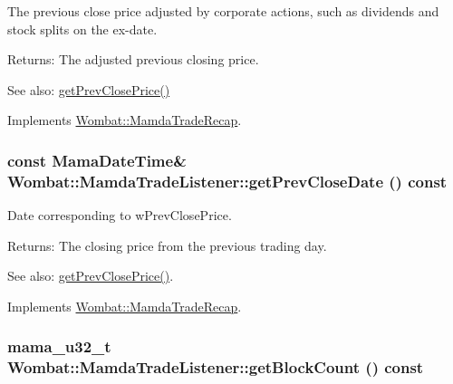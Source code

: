 The previous close price adjusted by corporate actions, such as dividends and stock splits on the ex-date. 

\begin{Desc}
\item[Returns:]The adjusted previous closing price. \end{Desc}
\begin{Desc}
\item[See also:]\hyperlink{classWombat_1_1MamdaTradeListener_7cef846e6625cd78c1c05cd25ea8ee09}{get\-Prev\-Close\-Price()} \end{Desc}


Implements \hyperlink{classWombat_1_1MamdaTradeRecap_6b50a84a3848169713d4110fc6ac1280}{Wombat::Mamda\-Trade\-Recap}.\hypertarget{classWombat_1_1MamdaTradeListener_ce42d352a2c3d93d2f7fd2d9131559e9}{
\subsubsection[getPrevCloseDate]{\setlength{\rightskip}{0pt plus 5cm}const Mama\-Date\-Time\& Wombat::Mamda\-Trade\-Listener::get\-Prev\-Close\-Date () const}}
\label{classWombat_1_1MamdaTradeListener_ce42d352a2c3d93d2f7fd2d9131559e9}


Date corresponding to w\-Prev\-Close\-Price. 

\begin{Desc}
\item[Returns:]The closing price from the previous trading day. \end{Desc}
\begin{Desc}
\item[See also:]\hyperlink{classWombat_1_1MamdaTradeListener_7cef846e6625cd78c1c05cd25ea8ee09}{get\-Prev\-Close\-Price()}. \end{Desc}


Implements \hyperlink{classWombat_1_1MamdaTradeRecap_cbe424a55e6fd1e9cd086b9884b7a6fc}{Wombat::Mamda\-Trade\-Recap}.\hypertarget{classWombat_1_1MamdaTradeListener_ef024667c725e6c83fc55a2a356899b4}{
\subsubsection[getBlockCount]{\setlength{\rightskip}{0pt plus 5cm}mama\_\-u32\_\-t Wombat::Mamda\-Trade\-Listener::get\-Block\-Count () const}}
\label{classWombat_1_1MamdaTradeListener_ef024667c725e6c83fc55a2a356899b4}



